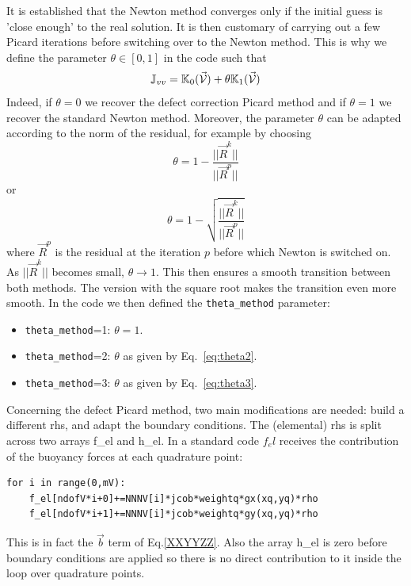 It is established that the Newton method converges only if the initial guess is 'close enough'
to the real solution. It is then customary of carrying out a few Picard iterations 
before switching over to the Newton method. 
This is why we define the parameter $\theta\in[0,1]$ in the code such that 
\[
{\mathbb{J}}_{vv} = {\mathbb{K}}_0(\vec{\cal V})+\theta {\mathbb{K}}_1(\vec{\cal V})
\]
Indeed, if $\theta=0$ we recover the defect correction Picard method and
if $\theta=1$ we recover the standard Newton method. 
Moreover, the parameter $\theta$ can be adapted according to the norm of 
the residual, for example by choosing 
\begin{equation}
\theta = 1 - \frac{||\vec{R}^k||}{||\vec{R}^p||} 
\label{eq:theta2}
\end{equation}
or
\begin{equation}
\theta = 1 - \sqrt{\frac{||\vec{R}^k||}{||\vec{R}^p||}}
\label{eq:theta3}
\end{equation}
where $\vec{R}^p$ is the residual at the iteration $p$ before which Newton is switched on.
As $||\vec{R}^k||$ becomes small, $\theta \rightarrow 1$.
This then ensures a smooth transition between both methods. The version 
with the square root makes the transition even more smooth.
In the code we then defined the {\tt theta\_method} parameter:
\begin{itemize}
\item {\tt theta\_method}=1: $\theta=1$.
\item {\tt theta\_method}=2: $\theta$ as given by Eq.~\eqref{eq:theta2}.
\item {\tt theta\_method}=3: $\theta$ as given by Eq.~\eqref{eq:theta3}.
\end{itemize}


Concerning the defect Picard method, two main modifications 
are needed: build a different rhs, and adapt the boundary conditions. 
The (elemental) rhs is split across two arrays {\python f\_el} and {\python h\_el}.
In a standard code $f_el$ receives the contribution of the buoyancy forces at 
each quadrature point:
\begin{lstlisting}
for i in range(0,mV):
    f_el[ndofV*i+0]+=NNNV[i]*jcob*weightq*gx(xq,yq)*rho
    f_el[ndofV*i+1]+=NNNV[i]*jcob*weightq*gy(xq,yq)*rho
\end{lstlisting}
This is in fact the $\vec{b}$ term of Eq.\eqref{XXYYZZ}. 
Also the array {\python h\_el} is zero before boundary conditions are
applied so there is no direct contribution to it inside the loop over 
quadrature points.

